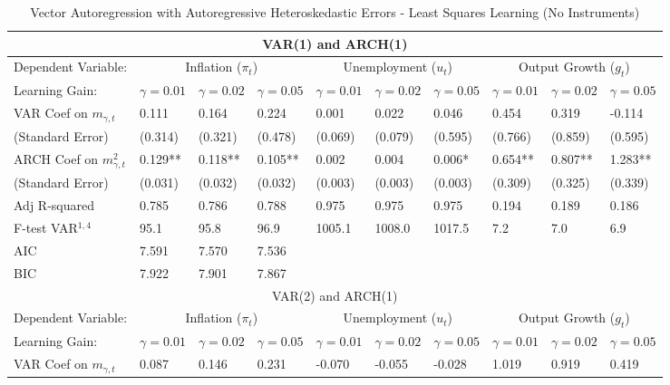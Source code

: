 \documentclass[12pt]{article}
\begin{document}
\begin{sidewaystable}\caption{Vector Autoregression with Autoregressive Heteroskedastic Errors - Least Squares Learning (No Instruments)}\label{tb:varls}
\begin{small}\begin{center}
\begin{tabular}{l|p{0.64in} p{0.64in} p{0.64in}|p{0.64in} p{0.64in} p{0.64in}|p{0.64in} p{0.64in} p{0.64in}}\hline
\multicolumn{10}{c}{VAR(1) and ARCH(1)} \\ \hline \hline
Dependent Variable:  & \multicolumn{3}{c|}{Inflation ($\pi_t$)} & \multicolumn{3}{c|}{Unemployment ($u_t$)} &  \multicolumn{3}{c}{Output Growth ($g_t$)} \\ \hline
Learning Gain: & $\gamma=0.01$ & $\gamma=0.02$ & $\gamma=0.05$ & $\gamma=0.01$ & $\gamma=0.02$ & $\gamma=0.05$& $\gamma=0.01$ & $\gamma=0.02$ & $\gamma=0.05$ \\ \hline
VAR Coef on $m_{\gamma,t}$ & 0.111 & 0.164 & 0.224 & 0.001 & 0.022 & 0.046 & 0.454 & 0.319 & -0.114 \\
(Standard Error) & (0.314) & (0.321) & (0.478) & (0.069) & (0.079) & (0.595) & (0.766) & (0.859) & (0.595) \\ \hline
ARCH Coef on $m_{\gamma,t}^2$ & 0.129** & 0.118** & 0.105** & 0.002 & 0.004 & 0.006* & 0.654** & 0.807** & 1.283** \\
(Standard Error) & (0.031) & (0.032) & (0.032) & (0.003) & (0.003) & (0.003) & (0.309) & (0.325) & (0.339) \\ \hline
Adj R-squared & 0.785 & 0.786 & 0.788 & 0.975 & 0.975 & 0.975 & 0.194 & 0.189 & 0.186 \\ 
F-test VAR$^{1,4}$ & 95.1 & 95.8 & 96.9 & 1005.1 & 1008.0 & 1017.5 & 7.2 & 7.0 & 6.9 \\ 
AIC & 7.591 & 7.570 & 7.536   & & &   & & & \\ 
BIC & 7.922 & 7.901 & 7.867   & & &   & & & \\ \hline \hline
\multicolumn{10}{c}{VAR(2) and ARCH(1)} \\ \hline \hline
Dependent Variable:  & \multicolumn{3}{c|}{Inflation ($\pi_t$)} & \multicolumn{3}{c|}{Unemployment ($u_t$)} &  \multicolumn{3}{c}{Output Growth ($g_t$)} \\ \hline
Learning Gain: & $\gamma=0.01$ & $\gamma=0.02$ & $\gamma=0.05$ & $\gamma=0.01$ & $\gamma=0.02$ & $\gamma=0.05$& $\gamma=0.01$ & $\gamma=0.02$ & $\gamma=0.05$ \\ \hline
VAR Coef on $m_{\gamma,t}$ & 0.087 & 0.146 & 0.231 & -0.070 & -0.055 & -0.028 & 1.019 & 0.919 & 0.419 \\

\end{tabular}
\end{center}
\end{small}
\end{sidewaystable}
\end{document}
